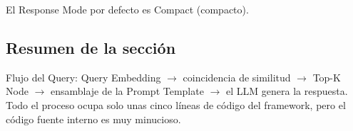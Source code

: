 El Response Mode por defecto es Compact (compacto).

\subsection{Resumen de la sección}

Flujo del Query: Query Embedding $\rightarrow$ coincidencia de similitud $\rightarrow$ Top-K Node $\rightarrow$ ensamblaje de la Prompt Template $\rightarrow$ el LLM genera la respuesta. Todo el proceso ocupa solo unas cinco líneas de código del framework, pero el código fuente interno es muy minucioso.

